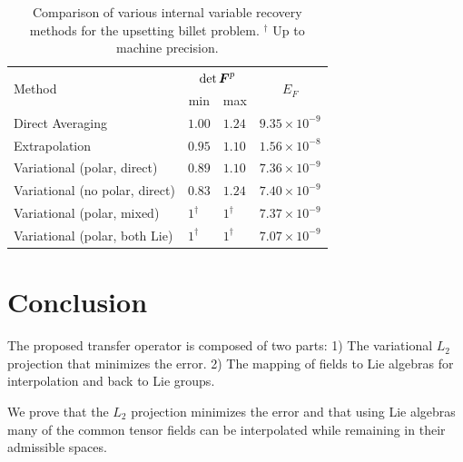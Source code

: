 \documentclass[12pt]{article}
\begin{document}
\begin{table}[htbp]
  \begin{center}
    \begin{tabular}{ l l l l }
      \toprule
      \multirow{2}{*}{Method}
      &
      \multicolumn{2}{c}{$\det {\boldsymbol{F}}^{p}$}
      & 
      \multicolumn{1}{c}{\multirow{2}{*}{$E_{F}$}}
      \\
      &
      \multicolumn{1}{c}{min}
      &
      \multicolumn{1}{c}{max}
      &
      \\
      \hline
      Direct Averaging
      &
      $1.00$
      & 
      $1.24$
      & 
      $9.35 \times 10^{-9}$
      \\
      Extrapolation   
      &
      $0.95$
      &
      $1.10$
      &
      $1.56 \times 10^{-8}$
      \\
      Variational (polar, direct)
      &
      $0.89$
      & 
      $1.10$
      & 
      $7.36 \times 10^{-9}$
      \\
      Variational (no polar, direct)
      &
      $0.83$
      & 
      $1.24$
      & 
      $7.40 \times 10^{-9}$
      \\
      Variational (polar, mixed)  
      &
      $1^\dagger$
      & 
      $1^\dagger$
      & 
      $7.37 \times 10^{-9}$
      \\
      Variational (polar, both Lie)  
      &
      $1^\dagger$
      & 
      $1^\dagger$
      & 
      $7.07 \times 10^{-9}$
      \\
      \bottomrule
    \end{tabular}
    \caption{Comparison of various internal variable recovery methods
      for the upsetting billet problem. $^\dagger$ Up to machine precision.}
    \label{tab:billet-error-comparison}
  \end{center}
\end{table}

\section{Conclusion}

The proposed transfer operator is composed of two parts: 1) The variational
$L_2$ projection that minimizes the error. 2) The mapping of fields to Lie
algebras for interpolation and back to Lie groups.

We prove that the $L_2$ projection minimizes the error and that using Lie
algebras many of the common tensor fields can be interpolated while remaining in
their admissible spaces.
\end{document}
